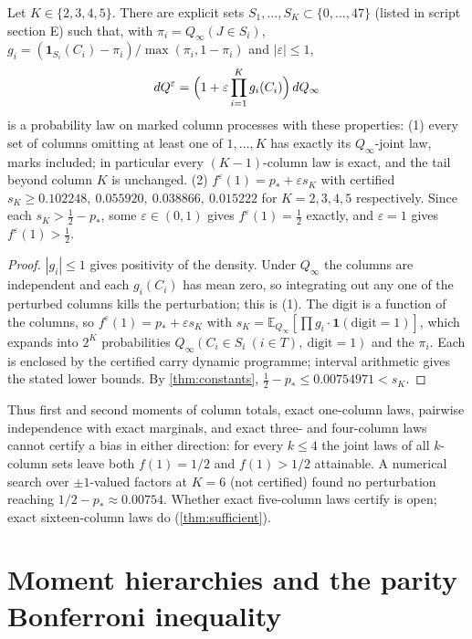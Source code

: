 \documentclass[11pt]{article}
\newcommand{\Ex}{\mathbb E}
\newcommand{\ind}{\mathbf 1}
\newcommand{\Qinf}{{Q_\infty}}
\begin{document}
\begin{theorem}\label{thm:hierarchy}
Let $K\in\{2,3,4,5\}$. There are explicit sets $S_1,\dots,S_K\subset\{0,\dots,47\}$ (listed in script section E) such that, with $\pi_i=\Qinf(J\in S_i)$, $g_i=(\ind_{S_i}(C_i)-\pi_i)/\max(\pi_i,1-\pi_i)$ and $|\varepsilon|\le1$,
\[
dQ^\varepsilon=\Bigl(1+\varepsilon\prod_{i=1}^Kg_i(C_i)\Bigr)\,d\Qinf
\]
is a probability law on marked column processes with these properties: (1) every set of columns omitting at least one of $1,\dots,K$ has exactly its $\Qinf$-joint law, marks included; in particular every $(K{-}1)$-column law is exact, and the tail beyond column $K$ is unchanged. (2) $f^\varepsilon(1)=p_*+\varepsilon s_K$ with certified $s_K\ge0.102248,\ 0.055920,\ 0.038866,\ 0.015222$ for $K=2,3,4,5$ respectively. Since each $s_K>\tfrac12-p_*$, some $\varepsilon\in(0,1)$ gives $f^\varepsilon(1)=\tfrac12$ exactly, and $\varepsilon=1$ gives $f^\varepsilon(1)>\tfrac12$.
\end{theorem}
\begin{proof}
$|g_i|\le1$ gives positivity of the density. Under $\Qinf$ the columns are independent and each $g_i(C_i)$ has mean zero, so integrating out any one of the perturbed columns kills the perturbation; this is (1). The digit is a function of the columns, so $f^\varepsilon(1)=p_*+\varepsilon s_K$ with $s_K=\Ex_{\Qinf}[\prod g_i\cdot\ind(\text{digit}=1)]$, which expands into $2^K$ probabilities $\Qinf(C_i\in S_i\ (i\in T),\ \text{digit}=1)$ and the $\pi_i$. Each is enclosed by the certified carry dynamic programme; interval arithmetic gives the stated lower bounds. By \cref{thm:constants}, $\tfrac12-p_*\le0.00754971<s_K$.
\end{proof}

Thus first and second moments of column totals, exact one-column laws, pairwise independence with exact marginals, and exact three- and four-column laws cannot certify a bias in either direction: for every $k\le4$ the joint laws of all $k$-column sets leave both $f(1)=1/2$ and $f(1)>1/2$ attainable. A numerical search over $\pm1$-valued factors at $K=6$ (not certified) found no perturbation reaching $1/2-p_*\approx0.00754$. Whether exact five-column laws certify is open; exact sixteen-column laws do (\cref{thm:sufficient}).

\section{Moment hierarchies and the parity Bonferroni inequality}\label{sec:moments}
\end{document}
